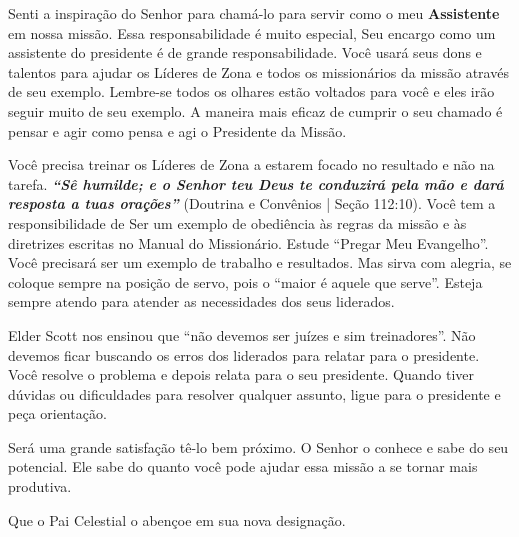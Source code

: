 Senti a inspira\c c\~ao do Senhor para cham\'a-lo para servir como o meu \textbf{Assistente} em nossa miss\~ao. Essa responsabilidade \'e muito especial, Seu encargo como um assistente do presidente \'e de grande responsabilidade. Voc\^e usar\'a seus dons e talentos para ajudar os L\'ideres de Zona e todos os mission\'arios da miss\~ao atrav\'es de seu exemplo. Lembre-se todos os olhares est\~ao voltados para voc\^e e eles ir\~ao seguir muito de seu exemplo. A maneira mais eficaz de cumprir o seu chamado \'e pensar e agir como pensa e agi o Presidente da Miss\~ao.

Voc\^e precisa treinar os L\'ideres de Zona a estarem focado no resultado e n\~ao na tarefa. \textbf{\textit{``S\^e humilde; e o Senhor teu Deus te conduzir\'a pela m\~ao e dar\'a resposta a tuas ora\c c\~oes''}} (Doutrina e Conv\^enios | Se\c c\~ao 112:10). Voc\^e tem a responsibilidade de Ser um exemplo de obedi\^encia \`as regras da miss\~ao e \`as diretrizes escritas no Manual do Mission\'ario. Estude ``Pregar Meu Evangelho''. Voc\^e precisar\'a ser um exemplo de trabalho e resultados. Mas sirva com alegria, se coloque sempre na posi\c c\~ao de servo, pois o ``maior \'e aquele que serve''. Esteja sempre atendo para atender as necessidades dos seus liderados.

Elder Scott nos ensinou que ``n\~ao devemos ser ju\'izes e sim treinadores''. N\~ao devemos ficar buscando os erros dos liderados para relatar para o presidente. Voc\^e resolve o problema e depois relata para o seu presidente. Quando tiver d\'uvidas ou dificuldades para resolver qualquer assunto, ligue para o presidente e pe\c ca orienta\c c\~ao.

Ser\'a uma grande satisfa\c c\~ao t\^e-lo bem pr\'oximo. O Senhor o conhece e sabe do seu potencial. Ele sabe do quanto voc\^e pode ajudar essa miss\~ao a se tornar mais produtiva.

Que o Pai Celestial o aben\c coe em sua nova designa\c c\~ao.
